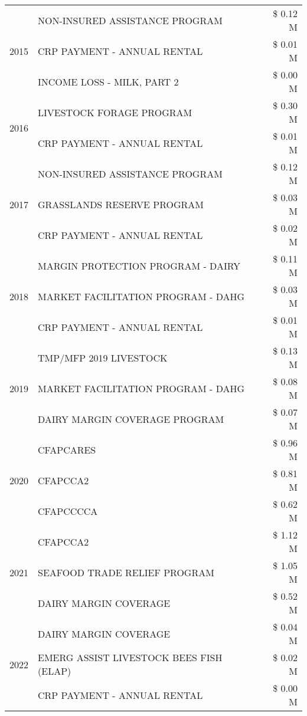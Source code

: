 \begin{tabular}{llr}
\cline{1-3}
\multirow[t]{3}{*}{2015} & NON-INSURED ASSISTANCE PROGRAM & \$ 0.12 M \\
 & CRP PAYMENT - ANNUAL RENTAL & \$ 0.01 M \\
 & INCOME LOSS - MILK, PART 2 & \$ 0.00 M \\
\cline{1-3}
\multirow[t]{2}{*}{2016} & LIVESTOCK FORAGE PROGRAM & \$ 0.30 M \\
 & CRP PAYMENT - ANNUAL RENTAL & \$ 0.01 M \\
\cline{1-3}
\multirow[t]{3}{*}{2017} & NON-INSURED ASSISTANCE PROGRAM & \$ 0.12 M \\
 & GRASSLANDS RESERVE PROGRAM & \$ 0.03 M \\
 & CRP PAYMENT - ANNUAL RENTAL & \$ 0.02 M \\
\cline{1-3}
\multirow[t]{3}{*}{2018} & MARGIN PROTECTION PROGRAM - DAIRY & \$ 0.11 M \\
 & MARKET FACILITATION PROGRAM - DAHG & \$ 0.03 M \\
 & CRP PAYMENT - ANNUAL RENTAL & \$ 0.01 M \\
\cline{1-3}
\multirow[t]{3}{*}{2019} & TMP/MFP 2019 LIVESTOCK & \$ 0.13 M \\
 & MARKET FACILITATION PROGRAM - DAHG & \$ 0.08 M \\
 & DAIRY MARGIN COVERAGE PROGRAM & \$ 0.07 M \\
\cline{1-3}
\multirow[t]{3}{*}{2020} & CFAPCARES & \$ 0.96 M \\
 & CFAPCCA2 & \$ 0.81 M \\
 & CFAPCCCCA & \$ 0.62 M \\
\cline{1-3}
\multirow[t]{3}{*}{2021} & CFAPCCA2 & \$ 1.12 M \\
 & SEAFOOD TRADE RELIEF PROGRAM & \$ 1.05 M \\
 & DAIRY MARGIN COVERAGE & \$ 0.52 M \\
\cline{1-3}
\multirow[t]{3}{*}{2022} & DAIRY MARGIN COVERAGE & \$ 0.04 M \\
 & EMERG ASSIST LIVESTOCK BEES FISH (ELAP) & \$ 0.02 M \\
 & CRP PAYMENT - ANNUAL RENTAL & \$ 0.00 M \\
\cline{1-3}
\bottomrule
\end{tabular}

